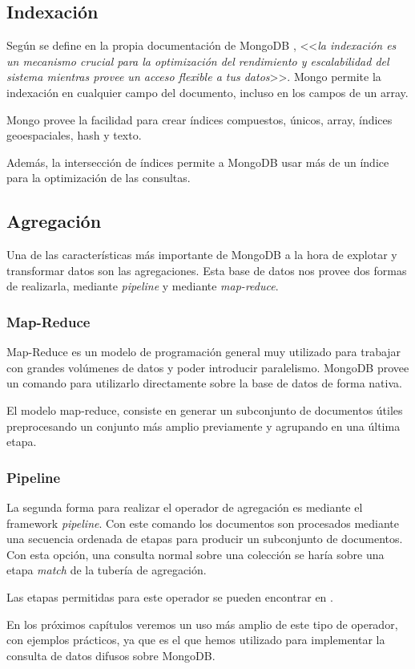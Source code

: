 \subsection{Indexación}

Según se define en la propia documentación de MongoDB \cite{mongodb}, <<\textit{la indexación es un mecanismo crucial para la optimización del rendimiento y escalabilidad del sistema mientras provee un acceso flexible a tus datos}>>. Mongo permite la indexación en cualquier campo del documento, incluso en los campos de un array.

Mongo provee la facilidad para crear índices compuestos, únicos, array, índices geoespaciales, hash y texto.

Además, la intersección de índices permite a MongoDB usar más de un índice para la optimización de las consultas.

\subsection{Agregación}

Una de las características más importante de MongoDB a la hora de explotar y transformar datos son las agregaciones. Esta base de datos nos provee dos formas de realizarla, mediante \textit{pipeline}    y mediante \textit{map-reduce}.

\subsubsection{Map-Reduce}

Map-Reduce es un modelo de programación general muy utilizado para trabajar con grandes volúmenes de datos y poder introducir paralelismo. MongoDB provee un comando para utilizarlo directamente sobre la base de datos de forma nativa.

El modelo map-reduce, consiste en generar un subconjunto de documentos útiles preprocesando un conjunto más amplio previamente y agrupando en una última etapa.

\subsubsection{Pipeline}

La segunda forma para realizar el operador de agregación es mediante el framework \textit{pipeline}. Con este comando los documentos son procesados mediante una secuencia ordenada de etapas para producir un subconjunto de documentos. Con esta opción, una consulta normal sobre una colección se haría sobre una etapa \textit{match} de la tubería de agregación.

Las etapas permitidas para este operador se pueden encontrar en \cite{aggregationstages}.

En los próximos capítulos veremos un uso más amplio de este tipo de operador, con ejemplos prácticos, ya que es el que hemos utilizado para implementar la consulta de datos difusos sobre MongoDB.
